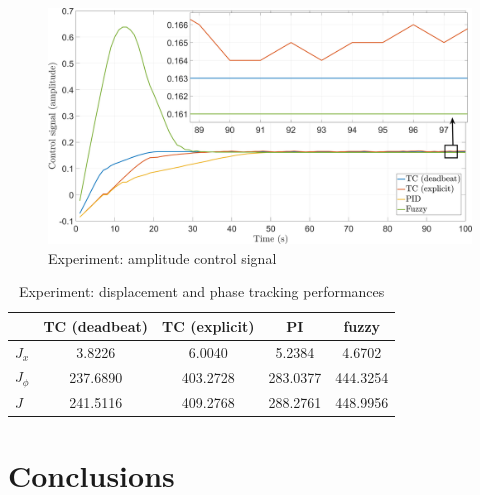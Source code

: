 \documentclass[preprint,12pt]{elsarticle}
\begin{document}
\begin{figure}
    \centering    \includegraphics[width=\linewidth]{F_control_amplitude.png}
    \caption{Experiment: amplitude control signal}
    \label{F_amplitude_control_signal}
\end{figure}



\begin{table}
    \centering
    \begin{tabular}{|l|c|c|c|c|} \hline
       \cellcolor{gray}  &  TC (deadbeat) &  TC (explicit)   & PI & fuzzy   \\  \hline 
      $J_x$     & 3.8226    & 6.0040    &  5.2384   & 4.6702  \\  \hline 
      $J_\phi$  & 237.6890  & 403.2728  & 283.0377  & 444.3254  \\ \hline 
       $J$ &  241.5116      & 409.2768  &   288.2761 & 448.9956 \\ \hline 
    \end{tabular}
    \vspace{0.1cm}
    \caption{Experiment: displacement and phase tracking performances}
    \label{T_J_experiment}
\end{table}



\section{Conclusions} \label{S_conclusions}
\end{document}

